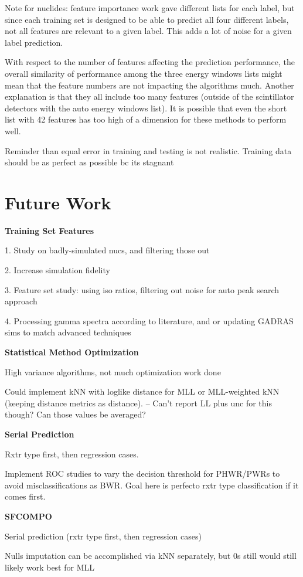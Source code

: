 Note for nuclides: feature importance work gave different lists for each label,
but since each training set is designed to be able to predict all four
different labels, not all features are relevant to a given label. This adds a
lot of noise for a given label prediction. 

With respect to the number of features affecting the prediction performance,
the overall similarity of performance among the three energy windows lists
might mean that the feature numbers are not impacting the algorithms much.
Another explanation is that they all include too many features (outside of the
scintillator detectors with the auto energy windows list).  It is possible that
even the short list with 42 features has too high of a dimension for these
methods to perform well. 

Reminder than equal error in training and testing is not realistic. Training
data should be as perfect as possible bc its stagnant

\section{Future Work}
\label{sec:future}

\noindent \textbf{Training Set Features}

1. Study on badly-simulated nucs, and filtering those out

2. Increase simulation fidelity

3. Feature set study: using iso ratios, filtering out noise for auto peak search approach

4. Processing gamma spectra according to literature, and or updating GADRAS sims to match advanced techniques

\noindent \textbf{Statistical Method Optimization}

High variance algorithms, not much optimization work done

Could implement kNN with loglike distance for MLL or MLL-weighted kNN (keeping 
distance metrics as distance). -- Can't report LL plus unc for this though? Can
those values be averaged?

\noindent \textbf{Serial Prediction}

Rxtr type first, then regression cases. 

Implement ROC studies to vary the decision threshold for PHWR/PWRs to avoid
misclassifications as BWR. Goal here is perfecto rxtr type classification if
it comes first. 

\noindent \textbf{\gls{SFCOMPO}}

Serial prediction (rxtr type first, then regression cases)

Nulls imputation can be accomplished via kNN separately, but 0s still would
still likely work best for MLL

